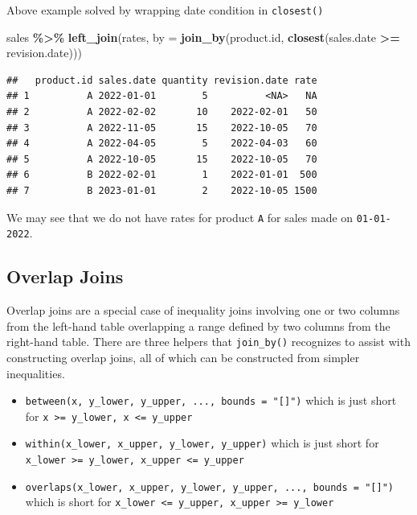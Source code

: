 \documentclass[
]{book}
\newenvironment{Shaded}{\begin{snugshade}}{\end{snugshade}}
\newcommand{\AttributeTok}[1]{\textcolor[rgb]{0.13,0.29,0.53}{#1}}
\newcommand{\FunctionTok}[1]{\textcolor[rgb]{0.13,0.29,0.53}{\textbf{#1}}}
\newcommand{\NormalTok}[1]{#1}
\newcommand{\SpecialCharTok}[1]{\textcolor[rgb]{0.81,0.36,0.00}{\textbf{#1}}}
\begin{document}
Above example solved by wrapping date condition in \texttt{closest()}

\begin{Shaded}
\begin{Highlighting}[]
\NormalTok{sales }\SpecialCharTok{\%\textgreater{}\%} 
  \FunctionTok{left\_join}\NormalTok{(rates,}
            \AttributeTok{by =} \FunctionTok{join\_by}\NormalTok{(product.id,}
                         \FunctionTok{closest}\NormalTok{(sales.date }\SpecialCharTok{\textgreater{}=}\NormalTok{ revision.date)))}
\end{Highlighting}
\end{Shaded}

\begin{verbatim}
##   product.id sales.date quantity revision.date rate
## 1          A 2022-01-01        5          <NA>   NA
## 2          A 2022-02-02       10    2022-02-01   50
## 3          A 2022-11-05       15    2022-10-05   70
## 4          A 2022-04-05        5    2022-04-03   60
## 5          A 2022-10-05       15    2022-10-05   70
## 6          B 2022-02-01        1    2022-01-01  500
## 7          B 2023-01-01        2    2022-10-05 1500
\end{verbatim}

We may see that we do not have rates for product \texttt{A} for sales made on \texttt{01-01-2022}.

\hypertarget{overlap-joins}{%
\subsection{Overlap Joins}\label{overlap-joins}}

Overlap joins are a special case of inequality joins involving one or two columns from the left-hand table overlapping a range defined by two columns from the right-hand table. There are three helpers that \texttt{join\_by()} recognizes to assist with constructing overlap joins, all of which can be constructed from simpler inequalities.

\begin{itemize}
\item
  \texttt{between(x,\ y\_lower,\ y\_upper,\ ...,\ bounds\ =\ "{[}{]}")} which is just short for \texttt{x\ \textgreater{}=\ y\_lower,\ x\ \textless{}=\ y\_upper}
\item
  \texttt{within(x\_lower,\ x\_upper,\ y\_lower,\ y\_upper)} which is just short for \texttt{x\_lower\ \textgreater{}=\ y\_lower,\ x\_upper\ \textless{}=\ y\_upper}
\item
  \texttt{overlaps(x\_lower,\ x\_upper,\ y\_lower,\ y\_upper,\ ...,\ bounds\ =\ "{[}{]}")} which is short for \texttt{x\_lower\ \textless{}=\ y\_upper,\ x\_upper\ \textgreater{}=\ y\_lower}
\end{itemize}
\end{document}
